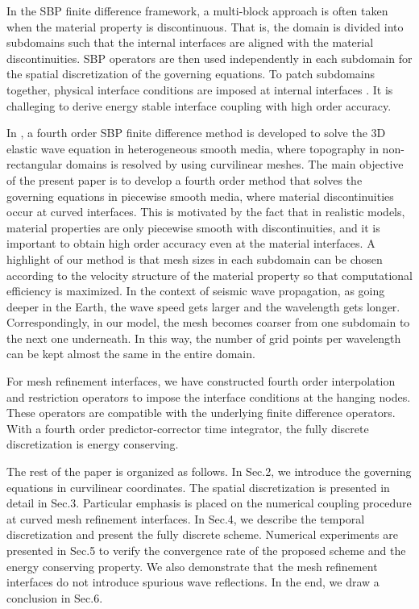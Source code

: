 In the SBP finite difference framework, a multi-block approach is often taken when the material property is discontinuous. That is, the domain is divided into subdomains such that the internal interfaces are aligned with the material discontinuities. SBP operators are then used independently in each subdomain for the spatial discretization of the governing equations. To patch subdomains together, physical interface conditions are imposed at internal interfaces \cite{Almquist2019,duru2014stable}. It is challeging to derive energy stable interface coupling with high order accuracy. 

In \cite{petersson2015wave}, a fourth order SBP finite difference method is developed to solve the 3D elastic wave equation in heterogeneous smooth media, where topography in non-rectangular domains is resolved by using curvilinear meshes. The main objective of the present paper is to develop a fourth order method that solves the governing equations in piecewise smooth media, where material discontinuities occur at curved interfaces. This is motivated by the fact that in realistic models, material properties are only piecewise smooth with discontinuities, and it is important to obtain high order accuracy even at the material interfaces. A highlight of our method is that mesh sizes in each subdomain can be chosen according to the velocity structure of the material property so that computational efficiency is maximized. In the context of seismic wave propagation, as going deeper in the Earth, the wave speed gets larger and the wavelength gets longer. Correspondingly, in our model, the mesh becomes coarser from one subdomain to the next one underneath. In this way, the number of grid points per wavelength can be kept almost the same in the entire domain. 

For mesh refinement interfaces, we have constructed fourth order interpolation and restriction operators to impose the interface conditions at the hanging nodes. These operators are compatible with the underlying finite difference operators. With a fourth order predictor-corrector time integrator, the fully discrete discretization is energy conserving. 

The rest of the paper is organized as follows. In Sec.2, we introduce the governing equations in curvilinear coordinates. The spatial discretization is presented in detail in Sec.3. Particular emphasis is placed on the numerical coupling procedure at curved mesh refinement interfaces. In Sec.4, we describe the temporal discretization and present the fully discrete scheme. Numerical experiments are presented in Sec.5 to verify the convergence rate of the proposed scheme and the energy conserving property. We also demonstrate that the mesh refinement interfaces do not introduce spurious wave reflections. In the end, we draw a conclusion in Sec.6. 
